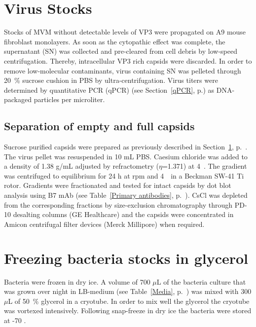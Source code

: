 
\section{Virus Stocks}
\label{Virus Stocks}
Stocks of MVM without detectable levels of VP3 were propagated on A9 mouse fibroblast monolayers. As soon as the cytopathic effect was complete, the supernatant (SN) was collected and pre-cleared from cell debris by low-speed centrifugation. Thereby, intracellular VP3 rich capsids were discarded. In order to remove low-molecular contaminants, virus containing SN was pelleted through 20~\% sucrose cushion in PBS by ultra-centrifugation. Virus titers were determined by quantitative PCR (qPCR) (see Section~\ref{qPCR}, p.\pageref{qPCR}) as DNA-packaged particles per microliter.   


\subsection{Separation of empty and full capsids}

Sucrose purified capsids were prepared as previously described in Section~\ref{Virus Stocks}, p.~\pageref{Virus Stocks}. The virus pellet was resuspended in 10 mL PBS. Caesium chloride was added to a density of 1.38 g/mL adjusted by refractometry ($\eta$=1.371) at 4~\textcelsius. The gradient was centrifuged to equilibrium for 24 h at  rpm and 4~\textcelsius~in a Beckman SW-41 Ti rotor. Gradients were fractionated and tested for intact capsids by dot blot analysis using B7 mAb (see Table~\ref{Primary antibodies}, p.~\pageref{Primary antibodies}). CsCl was depleted from the corresponding fractions by size-exclusion chromatography through PD-10 desalting columns (GE Healthcare) and the capsids were concentrated in Amicon\textsuperscript{\textregistered} centrifugal filter devices (Merck Millipore) when required.          
   
   


\section{Freezing bacteria stocks in glycerol}
Bacteria were frozen in dry ice. A volume of 700 $\mu$L of the bacteria culture that was grown over night in LB-medium (see Table~\ref{Media}, p.~\pageref{Media}) was mixed with 300 $\mu$L of 50~\% glycerol in a cryotube. In order to mix well the glycerol the cryotube was vortexed intensively. Following snap-freeze in dry ice the bacteria were stored at -70 \textcelsius.



